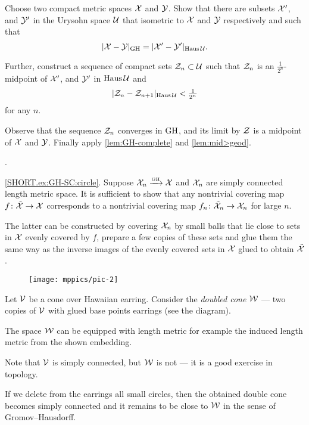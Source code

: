 Choose two compact metric spaces $\mathcal{X}$ and $\mathcal{Y}$.
Show that there are subsets $\mathcal{X}'$, and $\mathcal{Y}'$ in the Urysohn space $\mathcal{U}$ that isometric to $\mathcal{X}$ and $\mathcal{Y}$ respectively and such that 
\[|\mathcal{X}-\mathcal{Y}|_{\operatorname{\rm GH}\nolimits} = |\mathcal{X}'-\mathcal{Y}'|_{\operatorname{\rm Haus}\nolimits\mathcal{U}}.\]

Further, construct a sequence of compact sets $\mathcal{Z}_n\subset \mathcal{U}$ such that $\mathcal{Z}_n$ is an $\tfrac1{2^n}$-midpoint of $\mathcal{X}'$, and $\mathcal{Y}'$ in $\operatorname{\rm Haus}\nolimits\mathcal{U}$ and 
\[|\mathcal{Z}_n-\mathcal{Z}_{n+1}|_{\operatorname{\rm Haus}\nolimits\mathcal{U}}<\tfrac1{2^n}\]
for any $n$.

Observe that the sequence $\mathcal{Z}_n$ converges in $\operatorname{\rm GH}\nolimits$, and its limit by $\mathcal{Z}$ is a midpoint of $\mathcal{X}$ and $\mathcal{Y}$.
Finally apply \ref{lem:GH-complete} and \ref{lem:mid>geod}.

 \cite{ivanov-nikolaeva-tuzhilin}.

\parbf{\ref{ex:GH-SC},} \ref{SHORT.ex:GH-SC:circle}.
Suppose $\mathcal{X}_n\xrightarrow{\mbox{\tiny\rm GH}} \mathcal{X}$ and $\mathcal{X}_n$ are simply connected length metric space.
It is sufficient to show that any nontrivial covering map $f\colon\tilde{\mathcal{X}}\to \mathcal{X}$ corresponds to a nontrivial covering map $f_n\colon\tilde{\mathcal{X}}_n\to \mathcal{X}_n$ for large $n$.

The latter can be constructed by covering $\mathcal{X}_n$ by small balls that lie close to sets in $\mathcal{X}$ evenly covered by $f$, prepare a few copies of these sets and glue them the same way as the inverse images of the evenly covered sets in $\mathcal{X}$ glued to obtain $\tilde{\mathcal{X}}$.

\begin{wrapfigure}{r}{40 mm}
\vskip-0mm
\centering
\texttt{[image: mppics/pic-2]}
\end{wrapfigure}

Let $\mathcal{V}$ be a cone over Hawaiian earring.
Consider the {}\emph{doubled cone} $\mathcal{W}$ --- two copies of $\mathcal{V}$ with glued base points earrings (see the diagram).

The space $\mathcal{W}$ can be equipped with length metric for example the induced length metric from the shown embedding.

Note that $\mathcal{V}$ is simply connected, but $\mathcal{W}$ is not --- it is a good exercise in topology.

If we delete from the earrings all small circles, then the obtained double cone becomes simply connected and it remains to be close to $\mathcal{W}$ in the sense of Gromov--Hausdorff.

